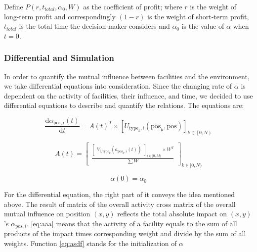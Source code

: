\documentclass[./main.tex]{subfiles}
\begin{document}
        Define $P\left( r, t_{total}, \alpha_0, W \right)$ as the coefficient of profit;
        where $r$ is the weight of long-term profit and correspondingly $\left( 1 - r \right)$ is the
weight of short-term profit,
        $t_{total}$ is the total time the decision-maker considers and $\alpha_0 $ is the value of $\alpha$ when $t
= 0$.

    \subsubsection{Differential and Simulation}

In order to quantify the mutual influence between facilities and the environment, we take differential equations into
consideration.
Since the changing rate of $\alpha$ is dependent on the activity of facilities, their influence, and time, we decided to
use differential equations to describe and quantify the relations.
The equations are:

        \begin{equation}
            \frac{\mathrm{d} \alpha_{\mathrm{pos}, i}\left ( t \right ) }{\mathrm{d} t} = A\left ( t \right )^T \times \left [ U_{\mathrm{type}_k, i}\left ( \mathrm{pos}_k, \mathrm{pos} \right ) \right ]_{k \in \left[ 0,N \right)}
            \label{eq:fuck}
        \end{equation}

        \begin{equation}
            \label{eq:aaa}
            A(t)=
            \begin{bmatrix}
                \frac{
                    \begin{bmatrix}
                        V_{i,\mathrm{type}_k}(a_{\mathrm{pos}_k,i}(t))
                    \end{bmatrix}_{i\in [0,M)}\times W^T}{\sum W}
            \end{bmatrix}_{k\in [0,N)}
        \end{equation}

        \begin{equation}
            \alpha \left( 0 \right) = \alpha_0
            \label{eq:asdf}
        \end{equation}



        For the differential equation, the right part of it conveys the idea mentioned above.
        The result of matrix of the overall activity cross matrix of the overall mutual influence on position $\left(x,y
\right)$ reflects the total absolute impact on  $\left(x,y\right)$ \rq{s} $\alpha_{\mathrm{pos}, i}$.
\eqref{eq:aaa} means that the activity of a facility equals to the sum of all products of the impact times
corresponding weight and divide by the sum of all weights.
Function \eqref{eq:asdf} stands for the initialization of $\alpha$
\end{document}
